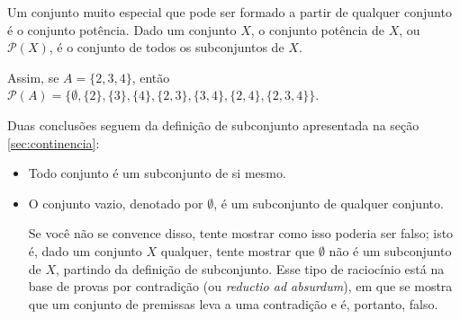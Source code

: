 \documentclass[11pt]{article}
\begin{document}
Um conjunto muito especial que pode ser formado a partir de qualquer conjunto é o conjunto potência. Dado um conjunto \(X\), o conjunto potência de \(X\), ou \(\mathcal{P}(X)\), é o conjunto de todos os subconjuntos de \(X\).

Assim, se \(A = \{2, 3, 4\}\), então \(\mathcal{P}(A) = \{\emptyset, \{2\}, \{3\}, \{4\}, \{2, 3\}, \{3, 4\}, \{2, 4\}, \{2, 3, 4\}\}\).

Duas conclusões seguem da definição de subconjunto apresentada na seção \ref{sec:continencia}:
\begin{itemize}
\item Todo conjunto é um subconjunto de si mesmo.
\item O conjunto vazio, denotado por \(\emptyset\), é um subconjunto de qualquer conjunto.

  Se você não se convence disso, tente mostrar como isso poderia ser falso; isto é, dado um conjunto \(X\) qualquer, tente mostrar que \(\emptyset\) não é um subconjunto de \(X\), partindo da definição de subconjunto. Esse tipo de raciocínio está na base de provas por contradição (ou \emph{reductio ad absurdum}), em que se mostra que um conjunto de premissas leva a uma contradição e é, portanto, falso.
\end{itemize}
\end{document}
